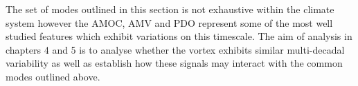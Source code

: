 The set of modes outlined in this section is not exhaustive within the climate system however the AMOC, AMV and PDO represent some of the most well studied features which exhibit variations on this timescale. The aim of analysis in chapters 4 and 5 is to analyse whether the vortex exhibits similar multi-decadal variability as well as establish how these signals may interact with the common modes outlined above.



